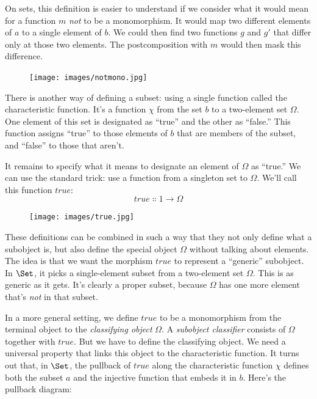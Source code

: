 \noindent
On sets, this definition is easier to understand if we consider what it
would mean for a function $m$ \emph{not} to be a monomorphism. It
would map two different elements of $a$ to a single element of
$b$. We could then find two functions $g$ and
$g'$ that differ only at those two elements. The
postcomposition with $m$ would then mask this difference.

\begin{figure}[H]
  \centering
  \texttt{[image: images/notmono.jpg]}
\end{figure}

\noindent
There is another way of defining a subset: using a single function
called the characteristic function. It's a function $\chi$ from the
set $b$ to a two-element set $\Omega$. One element of this set
is designated as ``true'' and the other as ``false.'' This function
assigns ``true'' to those elements of $b$ that are members of the
subset, and ``false'' to those that aren't.

It remains to specify what it means to designate an element of
$\Omega$ as ``true.'' We can use the standard trick: use a function
from a singleton set to $\Omega$. We'll call this function
$\mathit{true}$:
\[\mathit{true} \Colon 1 \to \Omega\]

\begin{figure}[H]
  \centering
  \texttt{[image: images/true.jpg]}
\end{figure}

\noindent
These definitions can be combined in such a way that they not only
define what a subobject is, but also define the special object
$\Omega$ without talking about elements. The idea is that we want the
morphism $\mathit{true}$ to represent a ``generic'' subobject. In
$\Set$, it picks a single-element subset from a two-element set
$\Omega$. This is as generic as it gets. It's clearly a proper subset,
because $\Omega$ has one more element that's \emph{not} in that
subset.

In a more general setting, we define $\mathit{true}$ to be a monomorphism
from the terminal object to the \emph{classifying object} $\Omega$.
A \emph{subobject classifier} consists of $\Omega$ together with $\mathit{true}$.
But we have to define the classifying object. We need a universal
property that links this object to the characteristic function. It turns
out that, in $\Set$, the pullback of $\mathit{true}$ along the
characteristic function $\chi$ defines both the subset $a$
and the injective function that embeds it in $b$. Here's the
pullback diagram:

